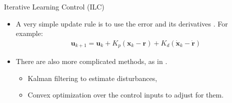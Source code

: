 \documentclass[handout]{beamer}
\newcommand{\state}{\mathbf{x}} %
\newcommand{\traj}{\mathbf{r}} %
\newcommand{\sysInput}{\mathbf{u}} %
\begin{document}
\begin{frame}{Iterative Learning Control (ILC)}
\begin{itemize}
\item A very simple update rule is to use the error and its derivatives \cite{Arimoto}. For example: \pause
\begin{equation*}
\begin{aligned}
\sysInput_{k+1} = \sysInput_{k} + K_{p}(\state_{k} - \traj) + K_{d}(\dot{\state}_{k} - \dot{\traj})
\end{aligned}
\end{equation*}
\pause
\item There are also more complicated methods, as in \cite{ILC_Angela}.
\pause
\begin{itemize}
 \item Kalman filtering to estimate disturbances, \pause
 \item Convex optimization over the control inputs to adjust for them.
\end{itemize}
\end{itemize}
\end{frame}
%
\end{document}
